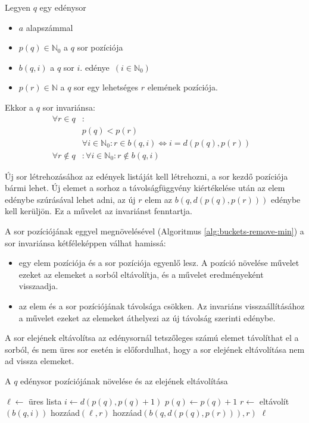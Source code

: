 Legyen $q$ egy edénysor
\begin{itemize}
\item $a$ alapszámmal
\item $p(q) \in \mathbb{N}_0$ a $q$ sor pozíciója
\item $b(q, i)$ a $q$ sor $i$. edénye\ $(i \in \mathbb{N}_0)$
\item $p(r) \in \mathbb{N}$ a $q$ sor egy lehetséges $r$ elemének pozíciója.
\end{itemize}
Ekkor a $q$ sor invariánsa:
\begin{align*}
\forall r \in q &: &\\ 
	& p(q) < p(r) \\
	& \forall i \in \mathbb{N}_0: r \in b(q, i) \iff i=d(p(q), p(r)) \\
\forall r \not\in q &: \forall i \in \mathbb{N}_0: r \not\in b(q, i)
\end{align*}

Új sor létrehozásához az edények listáját kell létrehozni, a sor kezdő pozíciója bármi lehet.
Új elemet a sorhoz a távolságfüggvény kiértékelése után az elem edénybe szúrásával lehet adni, az új $r$ elem az $b(q, d(p(q), p(r)))$ edénybe kell kerüljön.
Ez a művelet az invariánst fenntartja.

A sor pozíciójának eggyel megnövelésével (Algoritmus \ref{alg:buckets-remove-min}) a sor invariánsa kétféleképpen válhat hamissá:
\begin{itemize}
\item egy elem pozíciója és a sor pozíciója egyenlő lesz. A pozíció növelése művelet ezeket az elemeket a sorból eltávolítja, és a művelet eredményeként visszaadja.
\item az elem és a sor pozíciójának távolsága csökken. Az invariáns visszaállításához a művelet ezeket az elemeket áthelyezi az új távolság szerinti edénybe.
\end{itemize}
A sor elejének eltávolítsa az edénysornál tetszőleges számú elemet távolíthat el a sorból, és nem üres sor esetén is előfordulhat, hogy a sor elejének eltávolítása nem ad vissza elemeket.

\begin{algorithm}[H]
\caption{A $q$ edénysor pozíciójának növelése és az elejének eltávolítása}
\label{alg:buckets-remove-min}
\begin{algorithmic}[1]
	\State $\ell \gets$ üres lista
	\State $i \gets d(p(q), p(q)+1)$
	\State $p(q) \gets p(q)+1$
		\State $r \gets$ eltávolít$(b(q, i))$
			\State hozzáad$(\ell, r)$
		\Else
			\State hozzáad$(b(q, d(p(q), p(r))), r)$
		\EndIf
	\EndWhile
	\State \Return $\ell$
\EndFunction
\end{algorithmic}
\end{algorithm}

